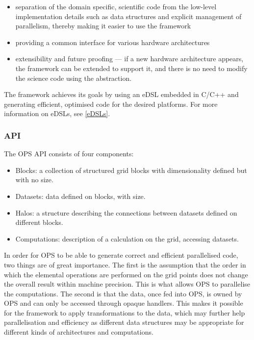 \documentclass[fontsize=11pt, appendixprefix=true]{scrreprt}
\begin{document}
\begin{itemize}
  \item separation of the domain specific, scientific code from the low-level
    implementation details such as data structures and explicit management of
    parallelism, thereby making it easier to use the framework
  \item providing a common interface for various hardware architectures
  \item extensibility and future proofing --- if a new hardware architecture
    appears, the framework can be extended to support it, and there is no need
    to modify the science code using the abstraction.
\end{itemize}

The framework achieves its goals by using an eDSL embedded in C/C++ and
generating efficient, optimised code for the desired platforms. For more
information on eDSLs, see \autoref{eDSLs}.

\subsubsection{API}

The OPS API consists of four components:

\begin{itemize}
  \item Blocks: a collection of structured grid blocks with dimensionality
    defined but with no size.
  \item Datasets: data defined on blocks, with size.
  \item Halos: a structure describing the connections between datasets defined
    on different blocks.
  \item Computations: description of a calculation on the grid, accessing
    datasets.
\end{itemize}

In order for OPS to be able to generate correct and efficient parallelised code,
two things are of great importance. The first is the assumption that the order
in which the elemental operations are performed on the grid points does not
change the overall result within machine precision. This is what allows OPS to
parallelise the computations. The second is that the data, once fed into OPS, is
owned by OPS and can only be accessed through opaque handlers. This makes it
possible for the framework to apply transformations to the data, which may
further help parallelisation and efficiency as different data structures may be
appropriate for different kinds of architectures and computations.
\end{document}
